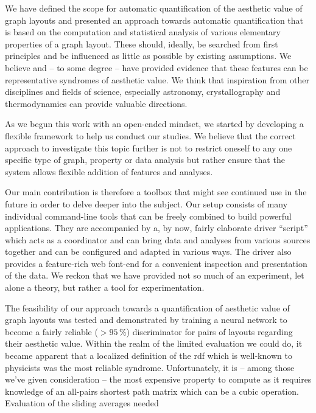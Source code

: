 \documentclass{graphstudy}
\begin{document}
We have defined the scope for automatic quantification of the aesthetic value of graph layouts and presented an approach
towards automatic quantification that is based on the computation and statistical analysis of various elementary
properties of a graph layout.  These should, ideally, be searched from first principles and be influenced as little as
possible by existing assumptions.  We believe and -- to some degree -- have provided evidence that these features can be
representative syndromes of aesthetic value.  We think that inspiration from other disciplines and fields of science,
especially astronomy, crystallography and thermodynamics can provide valuable directions.

As we begun this work with an open-ended mindset, we started by developing a flexible framework to help us conduct our
studies.  We believe that the correct approach to investigate this topic further is not to restrict oneself to any one
specific type of graph, property or data analysis but rather ensure that the system allows flexible addition of features
and analyses.

Our main contribution is therefore a toolbox that might see continued use in the future in order to delve deeper into
the subject.  Our setup consists of many individual command-line tools that can be freely combined to build powerful
applications.  They are accompanied by a, by now, fairly elaborate driver \enquote{script} which acts as a coordinator
and can bring data and analyses from various sources together and can be configured and adapted in various ways.
The driver also provides a feature-rich web font-end for a convenient inspection and presentation of the data.  We
reckon that we have provided not so much of an experiment, let alone a theory, but rather a tool for experimentation.

The feasibility of our approach towards a quantification of aesthetic value of graph layouts was tested and demonstrated
by training a neural network to become a fairly reliable (\(>95\,\%\)) discriminator for pairs of layouts regarding
their aesthetic value.  Within the realm of the limited evaluation we could do, it became apparent that a localized
definition of the \acl{rdf} which is well-known to physicists was the most reliable syndrome.  Unfortunately, it is --
among those we've given consideration -- the most expensive property to compute as it requires knowledge of an all-pairs
shortest path matrix which can be a cubic operation.  Evaluation of the sliding averages needed
\end{document}
